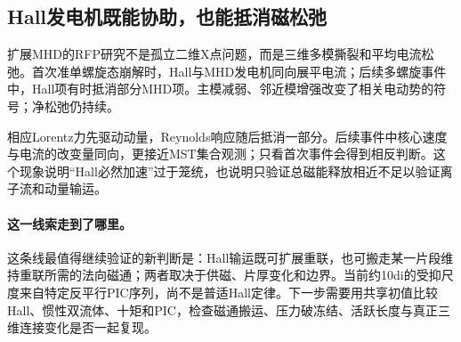 \subsection{Hall发电机既能协助，也能抵消磁松弛}
扩展MHD的RFP研究\citep{F798}不是孤立二维X点问题，而是三维多模撕裂和平均电流松弛。首次准单螺旋态崩解时，Hall与MHD发电机同向展平电流；后续多螺旋事件中，Hall项有时抵消部分MHD项。主模减弱、邻近模增强改变了相关电动势的符号；净松弛仍持续。

相应Lorentz力先驱动动量，Reynolds响应随后抵消一部分。后续事件中核心速度与电流的改变量同向，更接近MST集合观测；只看首次事件会得到相反判断。这个现象说明“Hall必然加速”过于笼统，也说明只验证总磁能释放相近不足以验证离子流和动量输运。

\paragraph{这一线索走到了哪里。}这条线最值得继续验证的新判断是：Hall输运既可扩展重联，也可搬走某一片段维持重联所需的法向磁通；两者取决于供磁、片厚变化和边界。当前约10di的受抑尺度来自特定反平行PIC序列，尚不是普适Hall定律。下一步需要用共享初值比较Hall、惯性双流体、十矩和PIC，检查磁通搬运、压力破冻结、活跃长度与真正三维连接变化是否一起复现。
